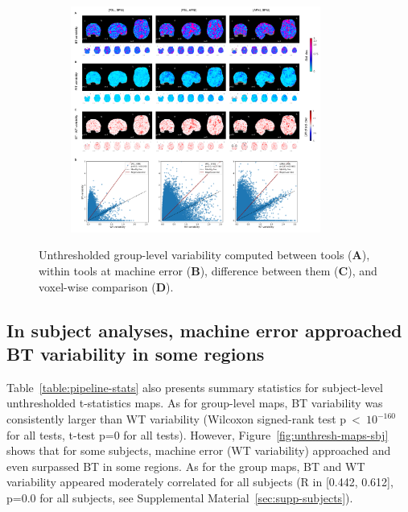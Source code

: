 \documentclass[11pt,onecolumn]{article}
\begin{document}
\begin{figure}[ht]
  \centering
      \begin{subfigure}[ht]{0.9\textwidth}
      \centering
      \includegraphics[width=0.9\textwidth]{figures/std/gl-unthresh.png}
      \end{subfigure}
    \caption{Unthresholded group-level variability computed between tools
    (\textbf{A}), within tools at machine error (\textbf{B}), difference
    between them (\textbf{C}), and voxel-wise comparison (\textbf{D}). }
    \label{fig:unthresh-maps}
  \end{figure}

  \subsection{In subject analyses, machine error approached BT variability in some regions}

  Table~\ref{table:pipeline-stats} also presents summary statistics for
  subject-level unthresholded t-statistics maps. As for group-level maps,
  BT variability was consistently larger than WT variability (Wilcoxon
  signed-rank test p~\textless~$10^{-160}$ for all tests, t-test p=0 for
  all tests). However, Figure~\ref{fig:unthresh-maps-sbj} shows that for
  some subjects, machine error (WT variability) approached and even
  surpassed BT in some regions. As for the group maps, BT and WT
  variability appeared moderately correlated for all subjects (R in [0.442,
  0.612], p=0.0 for all subjects, see Supplemental Material~\ref{sec:supp-subjects}).
\end{document}
